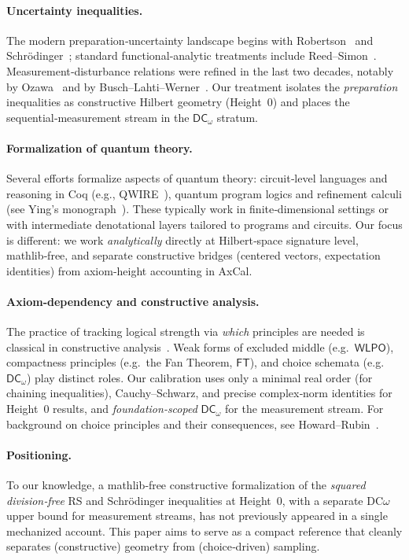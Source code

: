 \documentclass[11pt]{article}
\newcommand{\WLPO}{\mathsf{WLPO}}
\newcommand{\FT}{\mathsf{FT}}
\newcommand{\DCw}{\mathsf{DC}_{\omega}}
\theoremstyle{plain}
\theoremstyle{definition}
\theoremstyle{remark}
\begin{document}
\paragraph{Uncertainty inequalities.}
The modern preparation‑uncertainty landscape begins with Robertson~\cite{Robertson1929} and Schrödinger~\cite{Schrodinger1930}; standard functional‑analytic treatments include Reed--Simon~\cite{ReedSimonI}.
Measurement‑disturbance relations were refined in the last two decades, notably by Ozawa~\cite{Ozawa2003} and by Busch--Lahti--Werner~\cite{BuschLahtiWerner2014}.
Our treatment isolates the \emph{preparation} inequalities as constructive Hilbert geometry (Height~0) and places the sequential‑measurement stream in the $\DCw$ stratum.

\paragraph{Formalization of quantum theory.}
Several efforts formalize aspects of quantum theory:
circuit‑level languages and reasoning in Coq (e.g., QWIRE~\cite{QWIRE2017}),
quantum program logics and refinement calculi (see Ying's monograph~\cite{Ying2016}).
These typically work in finite‑dimensional settings or with intermediate denotational layers tailored to programs and circuits.
Our focus is different: we work \emph{analytically} directly at Hilbert‑space signature level, mathlib‑free, and separate constructive bridges (centered vectors, expectation identities) from axiom‑height accounting in AxCal.

\paragraph{Axiom‑dependency and constructive analysis.}
The practice of tracking logical strength via \emph{which} principles are needed is classical in constructive analysis~\cite{BishopBridges,BridgesRichman,TroelstraVanDalen}.
Weak forms of excluded middle (e.g.\ $\WLPO$), compactness principles (e.g.\ the Fan Theorem, $\FT$), and choice schemata (e.g.\ $\DCw$) play distinct roles.
Our calibration uses only a minimal real order (for chaining inequalities), Cauchy--Schwarz, and precise complex‑norm identities for Height~0 results, and \emph{foundation‑scoped} $\DCw$ for the measurement stream.
For background on choice principles and their consequences, see Howard--Rubin~\cite{HowardRubin}.

\paragraph{Positioning.}
To our knowledge, a mathlib‑free constructive formalization of the \emph{squared division‑free} RS and Schrödinger inequalities at Height~0, with a separate DC$\omega$ upper bound for measurement streams, has not previously appeared in a single mechanized account.
This paper aims to serve as a compact reference that cleanly separates (constructive) geometry from (choice‑driven) sampling.
\end{document}
